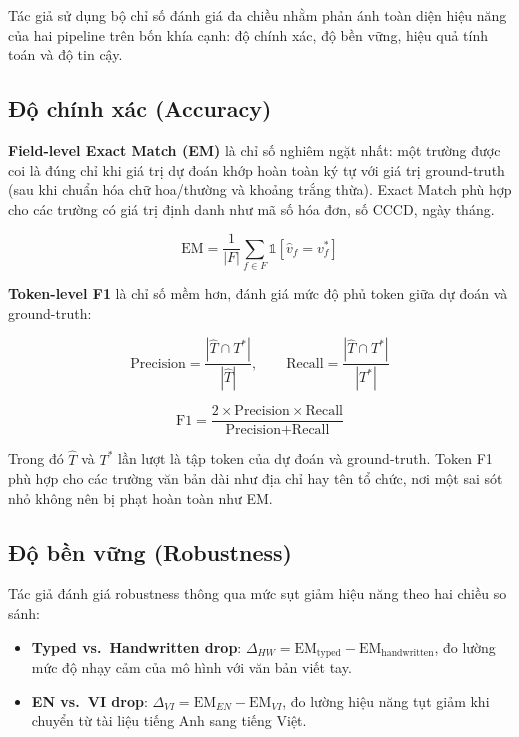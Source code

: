﻿\documentclass[12pt]{report}
\begin{document}
Tác giả sử dụng bộ chỉ số đánh giá đa chiều nhằm phản ánh toàn diện hiệu năng của hai pipeline trên bốn khía cạnh: độ chính xác, độ bền vững, hiệu quả tính toán và độ tin cậy.

\subsection{Độ chính xác (Accuracy)}\label{sec:accuracy}

\textbf{Field-level Exact Match (EM)} là chỉ số nghiêm ngặt nhất: một trường được coi là đúng chỉ khi giá trị dự đoán khớp hoàn toàn ký tự với giá trị ground-truth (sau khi chuẩn hóa chữ hoa/thường và khoảng trắng thừa). Exact Match phù hợp cho các trường có giá trị định danh như mã số hóa đơn, số CCCD, ngày tháng.

\begin{equation}
    \text{EM} = \frac{1}{|F|} \sum_{f \in F} \mathbb{1}[\hat{v}_f = v_f^*]
\end{equation}

\textbf{Token-level F1} là chỉ số mềm hơn, đánh giá mức độ phủ token giữa dự đoán và ground-truth:

\[
\text{Precision} = \frac{|\hat{T} \cap T^*|}{|\hat{T}|}, \qquad \text{Recall} = \frac{|\hat{T} \cap T^*|}{|T^*|}
\]

\[
\text{F1} = \frac{2 \times \text{Precision} \times \text{Recall}}{\text{Precision} + \text{Recall}}
\]

Trong đó $\hat{T}$ và $T^*$ lần lượt là tập token của dự đoán và ground-truth. Token F1 phù hợp cho các trường văn bản dài như địa chỉ hay tên tổ chức, nơi một sai sót nhỏ không nên bị phạt hoàn toàn như EM.

\subsection{Độ bền vững (Robustness)}\label{sec:robustness}

Tác giả đánh giá robustness thông qua mức sụt giảm hiệu năng theo hai chiều so sánh:

\begin{itemize}
    \item \textbf{Typed vs.\ Handwritten drop}: $\Delta_{HW} = \text{EM}_{\text{typed}} - \text{EM}_{\text{handwritten}}$, đo lường mức độ nhạy cảm của mô hình với văn bản viết tay.
    \item \textbf{EN vs.\ VI drop}: $\Delta_{VI} = \text{EM}_{EN} - \text{EM}_{VI}$, đo lường hiệu năng tụt giảm khi chuyển từ tài liệu tiếng Anh sang tiếng Việt.
\end{itemize}
\end{document}
